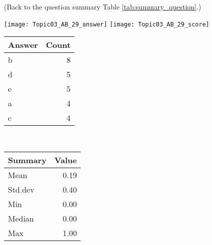 \documentclass[12pt,english,nohyper]{tufte-handout}\usepackage[]{graphicx}\usepackage[]{color}
\begin{document}
 (Back to the question summary Table \ref{tab:summary_question}.)

\begin{center} \texttt{[image: Topic03\_AB\_29\_answer]} \texttt{[image: Topic03\_AB\_29\_score]} \end{center} 

\begin{center}%
\begin{tabular}{lr}
  \hline
Answer & Count \\ 
  \hline
b &   8 \\ 
  d &   5 \\ 
  e &   5 \\ 
  a &   4 \\ 
  c &   4 \\ 
   \hline
\end{tabular}
~~~~~~~~%
\begin{tabular}{lr}
  \hline
Summary & Value \\ 
  \hline
Mean & 0.19 \\ 
  Std.dev & 0.40 \\ 
  Min & 0.00 \\ 
  Median & 0.00 \\ 
  Max & 1.00 \\ 
   \hline
\end{tabular}
\end{center}\newpage{}
\end{document}
